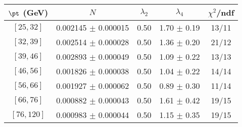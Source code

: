 \begin{tabular}{c||c|c|c|c}
$\pt$ (GeV) & $N$ & $\lambda_{2}$ & $\lambda_4$  & $\chi^2$/ndf  \\
\hline
$[25, 32]$ & 0.002145 $\pm$ 0.000015 & 0.50 & 1.70 $\pm$ 0.19 & 13/11\\
$[32, 39]$ & 0.002514 $\pm$ 0.000028 & 0.50 & 1.36 $\pm$ 0.20 & 21/12\\
$[39, 46]$ & 0.002893 $\pm$ 0.000049 & 0.50 & 1.09 $\pm$ 0.22 & 13/13\\
$[46, 56]$ & 0.001826 $\pm$ 0.000038 & 0.50 & 1.04 $\pm$ 0.22 & 14/14\\
$[56, 66]$ & 0.001927 $\pm$ 0.000062 & 0.50 & 0.89 $\pm$ 0.30 & 11/14\\
$[66, 76]$ & 0.000882 $\pm$ 0.000043 & 0.50 & 1.61 $\pm$ 0.42 & 19/15\\
$[76, 120]$ & 0.000983 $\pm$ 0.000044 & 0.50 & 1.15 $\pm$ 0.35 & 19/15\\
\end{tabular}
